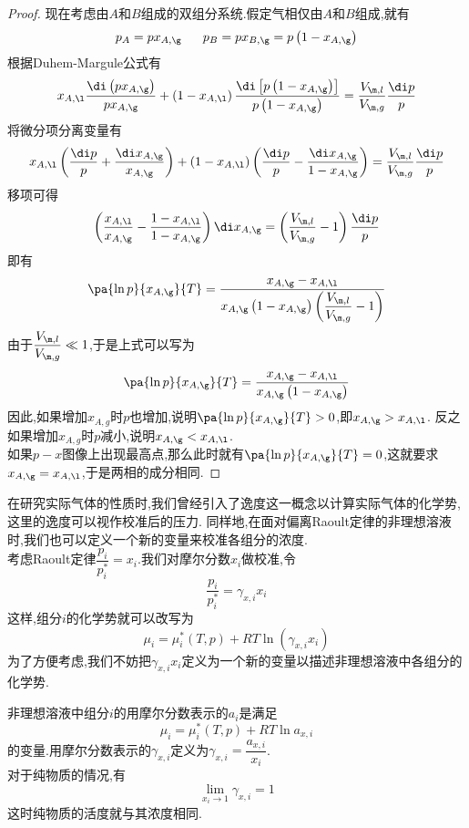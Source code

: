 \documentclass{ctexart}
\begin{document}
\begin{proof}
    现在考虑由$A$和$B$组成的双组分系统.假定气相仅由$A$和$B$组成,就有
    \[p_A=px_{A,\g}\ \ \ \ \ p_B=px_{B,\g}=p\left(1-x_{A,\g}\right)\]根据Duhem-Margule公式有
    \[x_{A,\l}\dfrac{\di\left(px_{A,\g}\right)}{px_{A,\g}}
    +\left(1-x_{A,\l}\right)\dfrac{\di\left[p\left(1-x_{A,\g}\right)\right]}{p\left(1-x_{A,\g}\right)}
    =\dfrac{V_{\m,l}}{V_{\m,g}}\dfrac{\di p}{p}\]
    将微分项分离变量有
    \[x_{A,\l}\left(\dfrac{\di p}{p}+\dfrac{\di x_{A,\g}}{x_{A,\g}}\right)+
    \left(1-x_{A,\l}\right)\left(\dfrac{\di p}{p}-\dfrac{\di x_{A,\g}}{1-x_{A,\g}}\right)
    =\dfrac{V_{\m,l}}{V_{\m,g}}\dfrac{\di p}{p}\]
    移项可得
    \[\left(\dfrac{x_{A,\l}}{x_{A,\g}}-\dfrac{1-x_{A,\l}}{1-x_{A,\g}}\right)\di x_{A,\g}
    =\left(\dfrac{V_{\m,l}}{V_{\m,g}}-1\right)\dfrac{\di p}{p}\]
    即有
    \[\pa{\ln p}{x_{A,\g}}{T}
    =\dfrac{x_{A,\g}-x_{A,\l}}{x_{A,\g}\left(1-x_{A,\g}\right)\left(\dfrac{V_{\m,l}}{V_{\m,g}}-1\right)}\]
    由于$\dfrac{V_{\m,l}}{V_{\m,g}}\ll1$,于是上式可以写为
    \[\pa{\ln p}{x_{A,\g}}{T}
    =\dfrac{x_{A,\g}-x_{A,\l}}{x_{A,\g}\left(1-x_{A,\g}\right)}\]
    因此,如果增加$x_{A,g}$时$p$也增加,说明$\pa{\ln p}{x_{A,\g}}{T}>0$,即$x_{A,\g}>x_{A,\l}$.%
    反之如果增加$x_{A,g}$时$p$减小,说明$x_{A,\g}<x_{A,\l}$.\\
    如果$p-x$图像上出现最高点,那么此时就有$\pa{\ln p}{x_{A,\g}}{T}=0$,这就要求$x_{A,\g}=x_{A,\l}$,于是两相的成分相同.
\end{proof}
\vspace{8pt}
\indent 在研究实际气体的性质时,我们曾经引入了逸度这一概念以计算实际气体的化学势,这里的逸度可以视作校准后的压力.%
同样地,在面对偏离Raoult定律的非理想溶液时,我们也可以定义一个新的变量来校准各组分的浓度.\\
\indent 考虑Raoult定律$\dfrac{p_i}{p_i^\ast}=x_i$.我们对摩尔分数$x_i$做校准,令
\[\dfrac{p_i}{p_i^\ast}=\gamma_{x,i}x_i\]
这样,组分$i$的化学势就可以改写为
\[\mu_i=\mu_i^\ast(T,p)+RT\ln\left(\gamma_{x,i}x_i\right)\]
为了方便考虑,我们不妨把$\gamma_{x,i}x_i$定义为一个新的变量以描述非理想溶液中各组分的化学势.
\begin{definition}[4C.5.1 活度与活度系数]
    非理想溶液中组分$i$的用摩尔分数表示的$a_i$是满足
    \[\mu_i=\mu_{i}^\ast(T,p)+RT\ln a_{x,i}\]
    的变量.用摩尔分数表示的$\gamma_{x,i}$定义为$\gamma_{x,i}=\dfrac{a_{x,i}}{x_i}$.\\
    对于纯物质的情况,有
    \[\lim_{x_i\to1}\gamma_{x,i}=1\]
    这时纯物质的活度就与其浓度相同.
\end{definition}
\end{document}

